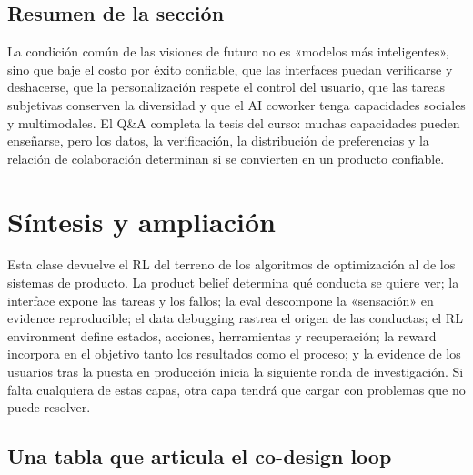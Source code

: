 \documentclass[a4paper]{article}
\begin{document}
\subsection{Resumen de la sección}

La condición común de las visiones de futuro no es «modelos más inteligentes», sino que baje el costo por éxito confiable, que las interfaces puedan verificarse y deshacerse, que la personalización respete el control del usuario, que las tareas subjetivas conserven la diversidad y que el AI coworker tenga capacidades sociales y multimodales. El Q\&A completa la tesis del curso: muchas capacidades pueden enseñarse, pero los datos, la verificación, la distribución de preferencias y la relación de colaboración determinan si se convierten en un producto confiable.
\section{Síntesis y ampliación}

Esta clase devuelve el RL del terreno de los algoritmos de optimización al de los sistemas de producto. La product belief determina qué conducta se quiere ver; la interface expone las tareas y los fallos; la eval descompone la «sensación» en evidence reproducible; el data debugging rastrea el origen de las conductas; el RL environment define estados, acciones, herramientas y recuperación; la reward incorpora en el objetivo tanto los resultados como el proceso; y la evidence de los usuarios tras la puesta en producción inicia la siguiente ronda de investigación. Si falta cualquiera de estas capas, otra capa tendrá que cargar con problemas que no puede resolver.

\subsection{Una tabla que articula el co-design loop}
\end{document}
